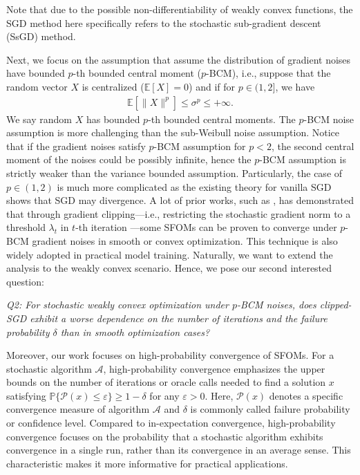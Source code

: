 \documentclass{article}
\def \E {\mathbb{E}}
\begin{document}
Note that due to the possible non-differentiability of weakly convex functions, the SGD method here specifically refers to the stochastic sub-gradient descent (SsGD) method.

Next, we focus on the assumption that assume the distribution of gradient noises have bounded $p$-th bounded central moment ($p$-BCM), i.e., suppose that the random vector $X$ is centralized ($\E[X]=0$) and if for $p\in(1,2]$, we have
\begin{align}\label{eq:p-BCM}
        \E[\|X\|^p]\leq \sigma^p\leq +\infty.
    \end{align}
We say random $X$ has bounded $p$-th bounded central moments. The $p$-BCM noise assumption is more challenging than the sub-Weibull noise assumption. Notice that if the gradient noises satisfy $p$-BCM assumption for $p<2$, the second central moment of the noises could be possibly infinite, hence the $p$-BCM assumption is  strictly weaker than the variance bounded assumption. Particularly, the case of $p\in(1,2)$ is much more complicated as the existing theory for vanilla SGD shows that SGD may divergence. A lot of  prior works, such as \citep{zhang_2020,Cutkosky_2021,Nguyen_2023,gorbunov2024highprobabilityconvergencecompositedistributed}, has demonstrated that through gradient clipping—i.e., restricting the stochastic gradient norm to a threshold $\lambda_t$ in $t$-th iteration —some SFOMs can be proven to converge under $p$-BCM gradient noises in smooth or convex optimization. This technique is also widely adopted in practical model training. Naturally, we want to extend the analysis to the weakly convex scenario. Hence, we pose our second interested question:
\begin{center}
\textit{Q2: For stochastic weakly convex optimization under $p$-BCM noises, does clipped-SGD exhibit a worse dependence on the number of iterations and the failure probability $\delta$ than in smooth optimization cases?}
\end{center}

Moreover, our work focuses on high-probability convergence of SFOMs. For a stochastic algorithm $\mathcal{A}$, high-probability convergence emphasizes the upper bounds on the number of iterations or oracle calls needed to find a solution $x$ satisfying $\mathbb{P}\{\mathcal{P}(x)\leq \varepsilon\}\geq1-\delta$ for any $\varepsilon>0$. Here, $\mathcal{P}(x)$ denotes a specific convergence measure of algorithm $\mathcal{A}$ and $\delta$ is commonly called failure probability or confidence level. Compared to in-expectation convergence, high-probability convergence focuses on the probability that a stochastic algorithm exhibits convergence in a single run, rather than its convergence in an average sense. This characteristic makes it more informative for practical applications.
\end{document}
